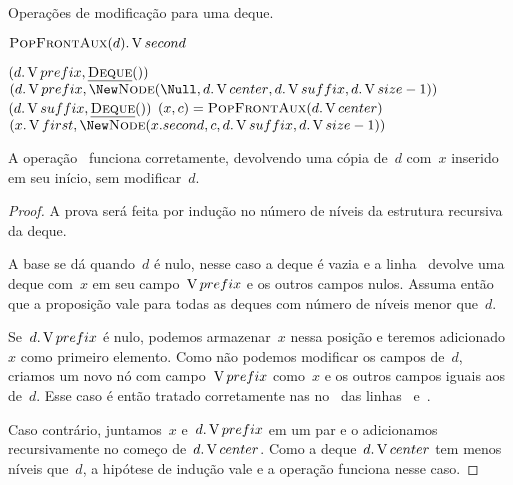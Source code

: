 \documentclass[main.tex]{subfiles}
\begin{document}
\begin{algorithm}
\caption{Operações de modificação para uma deque.} \label{lst:deque_mod}
\begin{algorithmic}[1]

		\State \Return \New {} \label{line:dm:puf1}
	 \label{line:dm:puf2}
		\State \Return \New {}\label{line:dm:puf2_1}
	\Else
		\State \Return \New {} \label{line:dm:puf3}
	\EndIf
\EndFunction

	\State \Return $\Call{PopFrontAux}{d}.\V{second}$
\EndFunction


	 \label{line:dm:pof0}
		\State \Return $(d.\operatorname{V}{prefix}, \mbox{\textsc{\underline{Deque}}\ensuremath{()}})$
	 \label{line:dm:pof1}
		\State \Return $(d.\V{prefix}, \New \Call{Node}{\Null, d.\V{center}, d.\V{suffix}, d.\V{size} - 1})$ \label{line:dm:pof1_2}
		\State \Return $(d.\V{suffix}, \funcAPI{Deque}{\null})$ \label{line:dm:pof2}
	\Else
		\State $(x, c) = \Call{PopFrontAux}{d.\V{center}}$
		\State \Return $(x.\V{first}, \New \Call{Node}{x.second, c, d.\V{suffix}, d.\V{size} - 1})$ \label{line:dm:pof3}
	\EndIf
\EndFunction

\end{algorithmic}
\end{algorithm}

\begin{proposition}
A operação~ funciona corretamente, devolvendo uma cópia de~$d$ com~$x$ inserido em seu início, sem modificar~$d$.
\end{proposition}

\begin{proof}
A prova será feita por indução no número de níveis da estrutura recursiva da deque.

A base se dá quando~$d$ é nulo, nesse caso a deque é vazia e a linha~ devolve uma deque com~$x$ em seu campo~$\operatorname{V}{prefix}$ e os outros campos nulos. Assuma então que a proposição vale para todas as deques com número de níveis menor que~$d$.

Se~$d.\operatorname{V}{prefix}$ é nulo, podemos armazenar~$x$ nessa posição e teremos adicionado~$x$ como primeiro elemento. Como não podemos modificar os campos de~$d$, criamos um novo nó com campo~$\operatorname{V}{prefix}$ como~$x$ e os outros campos iguais aos de~$d$. Esse caso é então tratado corretamente nas no~ das linhas~ e~.

Caso contrário, juntamos~$x$ e~$d.\operatorname{V}{prefix}$ em um par e o adicionamos recursivamente no começo de~$d.\operatorname{V}{center}$. Como a deque~$d.\operatorname{V}{center}$ tem menos níveis que~$d$, a hipótese de indução vale e a operação funciona nesse caso.
\end{proof}
\end{document}
